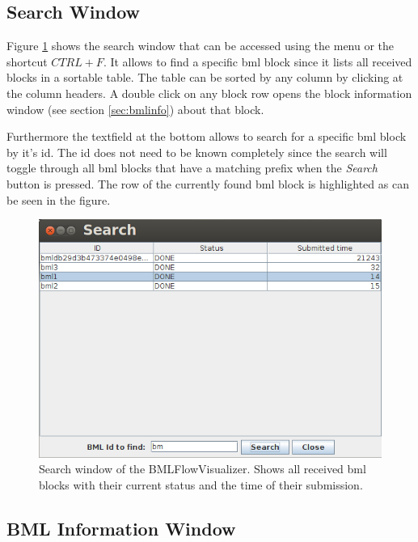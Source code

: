 \documentclass[12pt,a4paper]{article}
\begin{document}
\clearpage
\subsection{Search Window \label{sec:search}}

Figure \ref{fig:search} shows the search window that can be accessed using the menu or the shortcut $CTRL+F$. It allows to find a specific bml block since it lists all received blocks in a sortable table. The table can be sorted by any column by clicking at the column headers. A double click on any block row opens the block information window (see section \ref{sec:bmlinfo}) about that block.

Furthermore the textfield at the bottom allows to search for a specific bml block by it's id. The id does not need to be known completely since the search will toggle through all bml blocks that have a matching prefix when the \textit{Search} button is pressed. The row of the currently found bml block is highlighted as can be seen in the figure.

\begin{figure}[!htb]
\centering
 \includegraphics[width=\textwidth]{images/bmlFlowSearch.png}
 \caption{Search window of the BMLFlowVisualizer. Shows all received bml blocks with their current status and the time of their submission.}
 \label{fig:search}
\end{figure}

\subsection{BML Information Window \label{sec:bmlinfo}}
\end{document}
